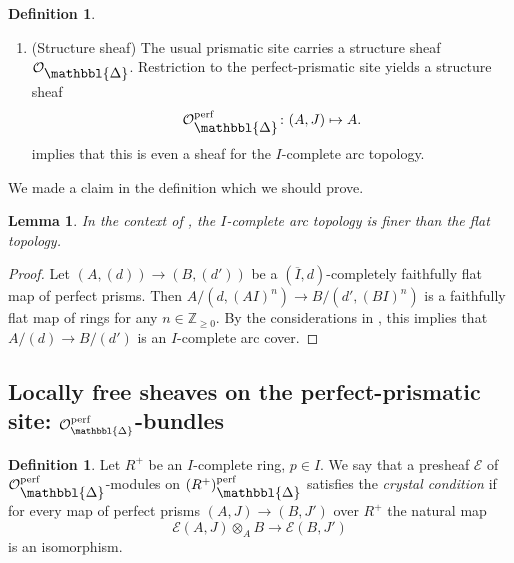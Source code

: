 \documentclass[10pt,twoside]{article}
\numberwithin{equation}{section}
\theoremstyle{plain}
\newtheorem{mylemma}[mythm]{Lemma}
\theoremstyle{definition}
\newtheorem{mydef}[mythm]{Definition}
\newcommand{\ZZ}{\mathbb{Z}}
\newcommand{\MCE}{\mathcal{E}}
\newcommand{\MCO}{\mathcal{O}}
\DeclareMathOperator{\perf}{perf}
\newcommand{\Prism}{{\mathlarger{\mathbbl{\Delta}}}}
\newcommand{\ZZgez}{\ZZ_{\geq 0}}
\begin{document}
\begin{mydef}
\begin{enumerate}
\begin{itemize}
\end{itemize}
The \(I\)-complete arc topology is finer than the flat topology (). The two descriptions of the base change above show that the covers in both topologies are stable under base change. Strictly speaking, we will use \((R^+)_{\Prism}^{\perf}\) to refer only to the underlying category of the site and will always explicitly mention which topology we put on it whenever it is relevant. 
    \item (Structure sheaf) The usual prismatic site carries a structure sheaf \(\MCO_\Prism\). Restriction to the perfect-prismatic site yields a structure sheaf
\[\MCO_{\Prism}^{\perf}\colon(A,J)\mapsto A.\]
 implies that this is even a sheaf for the \(I\)-complete arc topology.
\end{enumerate}
\end{mydef}



We made a claim in the definition which we should prove.

\begin{mylemma}\label{arcFinerThanFlat}
In the context of , the \(I\)-complete arc topology is finer than the flat topology.
\end{mylemma}

\begin{proof}
Let \((A,(d))\to (B,(d'))\) be a \((\overline I,d)\)-completely faithfully flat map of perfect prisms. Then \(A/(d, (AI)^n)\to B/(d', (BI)^n)\) is a faithfully flat map of rings for any \(n\in \ZZgez\). By the considerations in \cite[Example (2) at the beginning of Section 2.2.1]{CS21}, this implies that \(A/(d)\to B/(d')\) is an \(I\)-complete arc cover.
\end{proof}
\subsection {\texorpdfstring{Locally free sheaves on the perfect-prismatic site: \(\MCO^{\perf}_{\mathbbl{\Delta}}\)-bundles}
  {Locally free sheaves on the perfect-prismatic site: OΔperf-bundles}}
\begin{mydef}
Let \(R^+\) be an \(I\)-complete ring, \(p\in I\). We say that a presheaf \(\MCE\) of \(\MCO_{\Prism}^{\perf}\)-modules on \((R^+)_{\Prism}^{\perf}\) satisfies the \emph{crystal condition} if for every map of perfect prisms \((A,J)\to (B,J')\) over \(R^+\) the natural map
\[\MCE(A,J)\otimes_A B\longrightarrow\MCE(B,J')\]
is an isomorphism.
\end{mydef}
\end{document}
